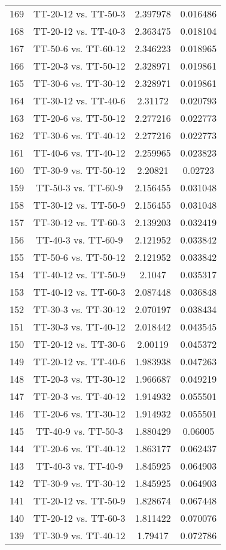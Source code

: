 \documentclass[a4paper,10pt]{article}
\begin{document}
\begin{landscape}
\begin{table}[!htp]
\begin{tabular}{cccc}
169&TT-20-12 vs. TT-50-3&2.397978&0.016486\\
168&TT-20-12 vs. TT-40-3&2.363475&0.018104\\
167&TT-50-6 vs. TT-60-12&2.346223&0.018965\\
166&TT-20-3 vs. TT-50-12&2.328971&0.019861\\
165&TT-30-6 vs. TT-30-12&2.328971&0.019861\\
164&TT-30-12 vs. TT-40-6&2.31172&0.020793\\
163&TT-20-6 vs. TT-50-12&2.277216&0.022773\\
162&TT-30-6 vs. TT-40-12&2.277216&0.022773\\
161&TT-40-6 vs. TT-40-12&2.259965&0.023823\\
160&TT-30-9 vs. TT-50-12&2.20821&0.02723\\
159&TT-50-3 vs. TT-60-9&2.156455&0.031048\\
158&TT-30-12 vs. TT-50-9&2.156455&0.031048\\
157&TT-30-12 vs. TT-60-3&2.139203&0.032419\\
156&TT-40-3 vs. TT-60-9&2.121952&0.033842\\
155&TT-50-6 vs. TT-50-12&2.121952&0.033842\\
154&TT-40-12 vs. TT-50-9&2.1047&0.035317\\
153&TT-40-12 vs. TT-60-3&2.087448&0.036848\\
152&TT-30-3 vs. TT-30-12&2.070197&0.038434\\
151&TT-30-3 vs. TT-40-12&2.018442&0.043545\\
150&TT-20-12 vs. TT-30-6&2.00119&0.045372\\
149&TT-20-12 vs. TT-40-6&1.983938&0.047263\\
148&TT-20-3 vs. TT-30-12&1.966687&0.049219\\
147&TT-20-3 vs. TT-40-12&1.914932&0.055501\\
146&TT-20-6 vs. TT-30-12&1.914932&0.055501\\
145&TT-40-9 vs. TT-50-3&1.880429&0.06005\\
144&TT-20-6 vs. TT-40-12&1.863177&0.062437\\
143&TT-40-3 vs. TT-40-9&1.845925&0.064903\\
142&TT-30-9 vs. TT-30-12&1.845925&0.064903\\
141&TT-20-12 vs. TT-50-9&1.828674&0.067448\\
140&TT-20-12 vs. TT-60-3&1.811422&0.070076\\
139&TT-30-9 vs. TT-40-12&1.79417&0.072786\\

\end{tabular}
\end{table}
\end{landscape}
\end{document}
